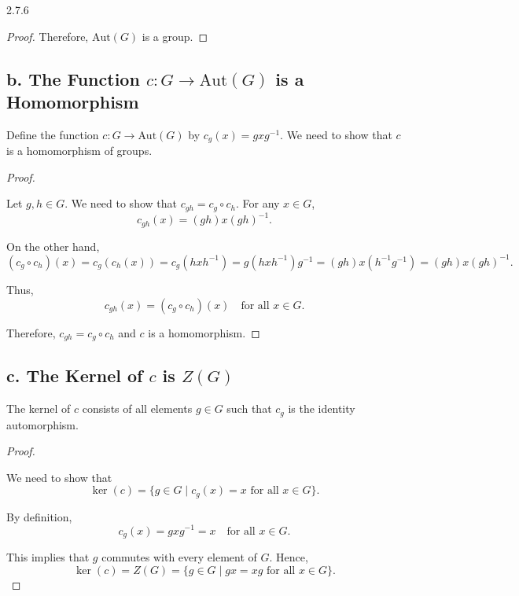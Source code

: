 \documentclass[12pt]{amsart}
\theoremstyle{definition}
\numberwithin{equation}{section}
\begin{document}
\begin{exercise}{2.7.6}
\begin{proof}
    Therefore, \(\text{Aut}(G)\) is a group.
    
    \end{proof}
    
    \subsection*{b. The Function \(c: G \rightarrow \text{Aut}(G)\) is a Homomorphism}
    
    Define the function \(c: G \rightarrow \text{Aut}(G)\) by \(c_g(x) = gxg^{-1}\). We need to show that \(c\) is a homomorphism of groups.
    
    \begin{proof} \( \)
    
    Let \(g, h \in G\). We need to show that \(c_{gh} = c_g \circ c_h\). For any \(x \in G\),
    \[
    c_{gh}(x) = (gh)x(gh)^{-1}.
    \]
    
    On the other hand,
    \[
    (c_g \circ c_h)(x) = c_g(c_h(x)) = c_g(hxh^{-1}) = g(hxh^{-1})g^{-1} = (gh)x(h^{-1}g^{-1}) = (gh)x(gh)^{-1}.
    \]
    
    Thus,
    \[
    c_{gh}(x) = (c_g \circ c_h)(x) \quad \text{for all } x \in G.
    \]
    
    Therefore, \(c_{gh} = c_g \circ c_h\) and \(c\) is a homomorphism.
    
    \end{proof}
    
    \subsection*{c. The Kernel of \(c\) is \(Z(G)\)}
    
    The kernel of \(c\) consists of all elements \(g \in G\) such that \(c_g\) is the identity automorphism.
    
    \begin{proof} \( \)
    
    We need to show that
    \[
    \ker(c) = \{ g \in G \mid c_g(x) = x \text{ for all } x \in G \}.
    \]
    
    By definition,
    \[
    c_g(x) = gxg^{-1} = x \quad \text{for all } x \in G.
    \]
    
    This implies that \(g\) commutes with every element of \(G\). Hence,
    \[
    \ker(c) = Z(G) = \{ g \in G \mid gx = xg \text{ for all } x \in G \}.
    \]
    
    \end{proof}
    

\end{exercise}
\end{document}
